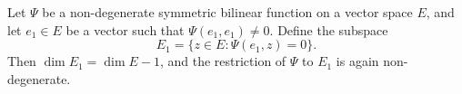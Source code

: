 Let $\Psi$ be a non-degenerate symmetric bilinear function on a vector space $E$, and let $e_1 \in E$ be a vector such that $\Psi(e_1, e_1) \neq 0$. Define the subspace
$$E_1 = \{z \in E : \Psi(e_1, z) = 0\}.$$
Then $\dim E_1 = \dim E - 1$, and the restriction of $\Psi$ to $E_1$ is again non-degenerate.
